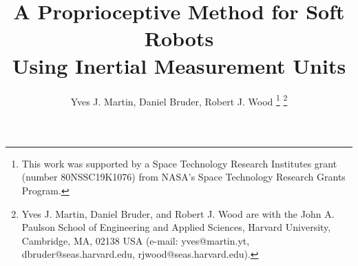 \title{A Proprioceptive Method for Soft Robots\\ Using Inertial Measurement Units%
}

\author{Yves J. Martin, Daniel Bruder, Robert J. Wood%
\thanks{This work was supported by a Space Technology Research Institutes
grant (number 80NSSC19K1076) from NASA’s Space Technology Research
Grants Program.}%
\thanks{Yves J. Martin, Daniel Bruder, and Robert J. Wood are with the John A. Paulson School of Engineering and Applied Sciences, Harvard University, Cambridge, MA, 02138 USA (e-mail: yves@martin.yt, dbruder@seas.harvard.edu, rjwood@seas.harvard.edu).}%
}


\maketitle